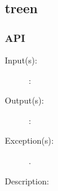 %
%
%
%
%              

\subsection{treen}
\label{treen}

\subsubsection{API}
\begin{description}
\label{treen_}
\item[{\cfunc[]{treen\_}{}}: ]
	\begin{description}\item[]
	\item[Input(s): ]
		\begin{description}\item[]
		\item[: ]
		\end{description}
	\item[Output(s): ]
		\begin{description}\item[]
		\item[: ]
		\end{description}
	\item[Exception(s): ]
		\begin{description}\item[]
		\item[.]
		\end{description}
	\item[Description: ]
	\end{description}
\end{description}
